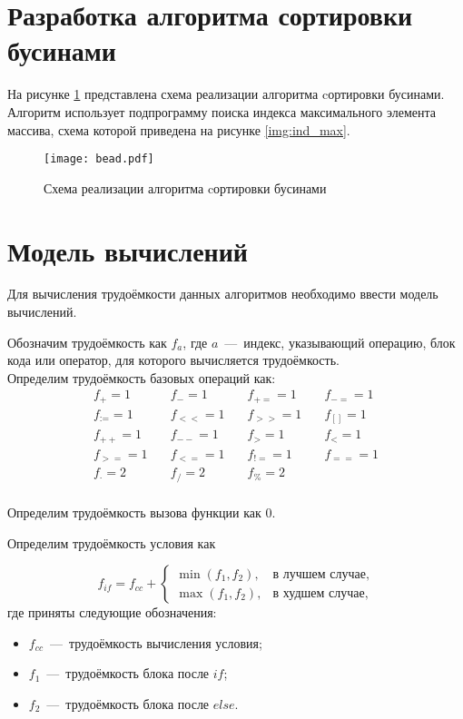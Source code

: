 \section{Разработка алгоритма сортировки бусинами}
На рисунке \ref{img:bead} представлена схема реализации алгоритма cортировки бусинами. Алгоритм использует подпрограмму поиска индекса максимального элемента массива, схема которой приведена на рисунке \ref{img:ind_max}.

\begin{figure}[h!]
    \centering
    \texttt{[image: bead.pdf]}
    \caption{Схема реализации алгоритма cортировки бусинами}
    \label{img:bead}
\end{figure}

\newpage

\section{Модель вычислений}
Для вычисления трудоёмкости данных алгоритмов необходимо ввести модель вычислений.

Обозначим трудоёмкость \cite{web_item6} как $f_{a}$, где $a$~---~индекс, указывающий операцию, блок кода или оператор, для которого вычисляется трудоёмкость. \\

Определим трудоёмкость базовых операций как:
\begin{equation}
\begin{array}{rrrr}
	f_{+}=1 & \quad f_{-}=1 & \quad f_{+=}=1 & \quad f_{-=}=1 \\
	f_{:=}=1 & \quad f_{<<}=1 & \quad f_{>>}=1 & \quad f_{[]}=1 \\
	f_{++}=1 & \quad f_{--}=1 & \quad f_{>}=1 & \quad f_{<}=1 \\
	f_{>=}=1 & \quad f_{<=}=1 & \quad f_{!=}=1 & \quad f_{==}=1 \\
	f_{\cdot}=2 & \quad f_{/}=2 & \quad f_{\%}=2 & \quad \\
\end{array}
\end{equation}

Определим трудоёмкость вызова функции как $0$.

Определим трудоёмкость условия как

\begin{equation}
	f_{if} = f_{cc} + \begin{cases}
		\min(f_1, f_2),& \text{в лучшем случае}, \\
		\max(f_1, f_2),& \text{в худшем случае},
	\end{cases}
\end{equation}
где приняты следующие обозначения:
\begin{itemize}
	\item $f_{cc}$~---~трудоёмкость вычисления условия;
	\item $f_1$~---~трудоёмкость блока после $if$;
	\item $f_2$~---~трудоёмкость блока после $else$.
\end{itemize}

